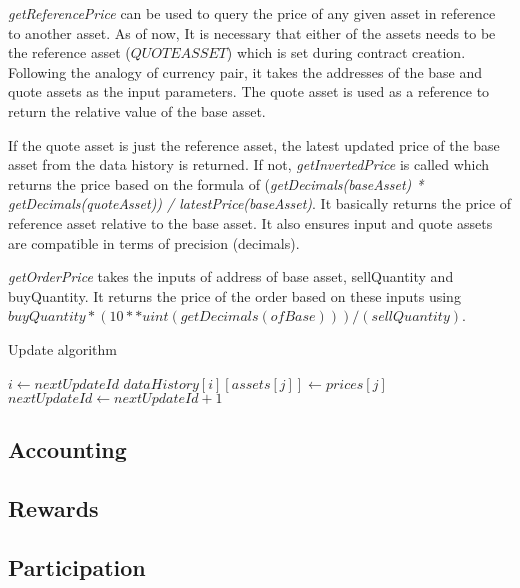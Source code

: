 \documentclass[conference]{IEEEtran}
\begin{document}
\textit{getReferencePrice} can be used to query the price of any given asset in reference to another asset. As of now, It is necessary that either of the assets needs to be the reference asset ($QUOTEASSET$) which is set during contract creation. Following the analogy of currency pair, it takes the addresses of the base and quote assets as the input parameters. The quote asset is used as a reference to return the relative value of the base asset.

If the quote asset is just the reference asset, the latest updated price of the base asset from the data history is returned. If not, \textit{getInvertedPrice} is called which returns the price based on the formula of (\textit{getDecimals(baseAsset)  * getDecimals(quoteAsset)) / latestPrice(baseAsset)}. It basically returns the price of reference asset relative to the base asset. It also ensures input and quote assets are compatible in terms of precision (decimals).

\textit{getOrderPrice} takes the inputs of address of base asset, sellQuantity and buyQuantity. It returns the price of the order based on these inputs using $buyQuantity * (10 ** uint(getDecimals(ofBase))) / (sellQuantity)$. 

\begin{algorithm}
	\caption{Update algorithm}
	\label{update}
	\begin{algorithmic}[1] %
		 
		\State $i\gets nextUpdateId$
		\State $dataHistory[i][assets[j]] \gets prices[j]$ 
		\EndFor\label{euclidendwhile}
		\State $nextUpdateId \gets nextUpdateId + 1$
		\EndProcedure
	\end{algorithmic}
\end{algorithm}

\subsection{Accounting} \label{component:accounting}

\subsection{Rewards}

\subsection{Participation}
\end{document}
